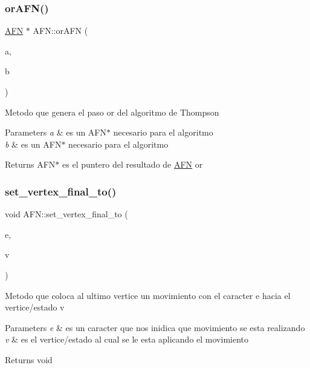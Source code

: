 \subsubsection{\texorpdfstring{or\+A\+F\+N()}{orAFN()}}
{\footnotesize\ttfamily \hyperlink{class_a_f_n}{A\+FN} $\ast$ A\+F\+N\+::or\+A\+FN (\begin{DoxyParamCaption}\item[{\hyperlink{class_a_f_n}{A\+FN} $\ast$}]{a,  }\item[{\hyperlink{class_a_f_n}{A\+FN} $\ast$}]{b }\end{DoxyParamCaption})}

Metodo que genera el paso or del algoritmo de Thompson 
\begin{DoxyParams}{Parameters}
{\em a} & es un A\+F\+N$\ast$ necesario para el algoritmo \\
\hline
{\em b} & es un A\+F\+N$\ast$ necesario para el algoritmo \\
\hline
\end{DoxyParams}
\begin{DoxyReturn}{Returns}
A\+F\+N$\ast$ es el puntero del resultado de \hyperlink{class_a_f_n}{A\+FN} or 
\end{DoxyReturn}
\hypertarget{class_a_f_n_aa90d4bcae1545e5a8900dcfa2a52cea0}{}\label{class_a_f_n_aa90d4bcae1545e5a8900dcfa2a52cea0} 
\subsubsection{\texorpdfstring{set\+\_\+vertex\+\_\+final\+\_\+to()}{set\_vertex\_final\_to()}}
{\footnotesize\ttfamily void A\+F\+N\+::set\+\_\+vertex\+\_\+final\+\_\+to (\begin{DoxyParamCaption}\item[{char}]{e,  }\item[{\hyperlink{structvertex}{vertex} $\ast$}]{v }\end{DoxyParamCaption})}

Metodo que coloca al ultimo vertice un movimiento con el caracter e hacia el vertice/estado v 
\begin{DoxyParams}{Parameters}
{\em e} & es un caracter que nos inidica que movimiento se esta realizando \\
\hline
{\em v} & es el vertice/estado al cual se le esta aplicando el movimiento \\
\hline
\end{DoxyParams}
\begin{DoxyReturn}{Returns}
void 
\end{DoxyReturn}
\hypertarget{class_a_f_n_a3c8a2713c6eb32a230b52e0eface276f}{}\label{class_a_f_n_a3c8a2713c6eb32a230b52e0eface276f} 
